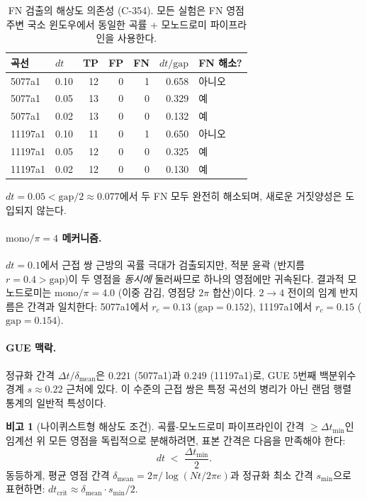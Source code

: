 \documentclass[11pt, a4paper]{article}
\theoremstyle{plain}
\theoremstyle{definition}
\newtheorem{remark}{비고}[section]
\begin{document}
\begin{table}[ht]
\centering
\caption{FN 검출의 해상도 의존성 (C-354).  모든 실험은
  FN 영점 주변 국소 윈도우에서 동일한 곡률 + 모노드로미
  파이프라인을 사용한다.}
\label{tab:resolution}
\small
\begin{tabular}{llrrrrl}
\toprule
곡선 & $dt$ & TP & FP & FN & $dt/\mathrm{gap}$ & FN 해소? \\
\midrule
5077a1  & 0.10 & 12 & 0 & 1 & 0.658 & 아니오 \\
5077a1  & 0.05 & 13 & 0 & 0 & 0.329 & 예 \\
5077a1  & 0.02 & 13 & 0 & 0 & 0.132 & 예 \\
\midrule
11197a1 & 0.10 & 11 & 0 & 1 & 0.650 & 아니오 \\
11197a1 & 0.05 & 12 & 0 & 0 & 0.325 & 예 \\
11197a1 & 0.02 & 12 & 0 & 0 & 0.130 & 예 \\
\bottomrule
\end{tabular}
\end{table}

$dt=0.05 < \mathrm{gap}/2 \approx 0.077$에서 두 FN 모두
완전히 해소되며, 새로운 거짓양성은 도입되지 않는다.

\paragraph{$\mathrm{mono}/\pi=4$ 메커니즘.}
$dt=0.1$에서 근접 쌍 근방의 곡률 극대가 검출되지만,
적분 윤곽 (반지름 $r=0.4 > \mathrm{gap}$)이
두 영점을 \emph{동시에} 둘러싸므로 하나의 영점에만 귀속된다.
결과적 모노드로미는 $\mathrm{mono}/\pi = 4.0$
(이중 감김, 영점당 $2\pi$ 합산)이다.
$2\to 4$ 전이의 임계 반지름은 간격과 일치한다:
5077a1에서 $r_{c} = 0.13$ ($\mathrm{gap}=0.152$),
11197a1에서 $r_{c}=0.15$ ($\mathrm{gap}=0.154$).

\paragraph{GUE 맥락.}
정규화 간격 $\Delta t/\delta_{\mathrm{mean}}$은
$0.221$ (5077a1)과 $0.249$ (11197a1)로,
GUE 5번째 백분위수 경계 $s\approx 0.22$ 근처에 있다.
이 수준의 근접 쌍은 특정 곡선의 병리가 아닌
랜덤 행렬 통계의 일반적 특성이다.

\begin{remark}[나이퀴스트형 해상도 조건]
\label{obs:nyquist}
곡률-모노드로미 파이프라인이 간격 $\geq \Delta t_{\min}$인
임계선 위 모든 영점을 독립적으로 분해하려면,
표본 간격은 다음을 만족해야 한다:
\[
  dt \;<\; \frac{\Delta t_{\min}}{2}.
\]
동등하게, 평균 영점 간격
$\delta_{\mathrm{mean}} = 2\pi/\!\log(Nt/2\pi e)$과
정규화 최소 간격 $s_{\min}$으로 표현하면:
$dt_{\mathrm{crit}} \approx \delta_{\mathrm{mean}}\cdot s_{\min}/2$.
\end{remark}
\end{document}
